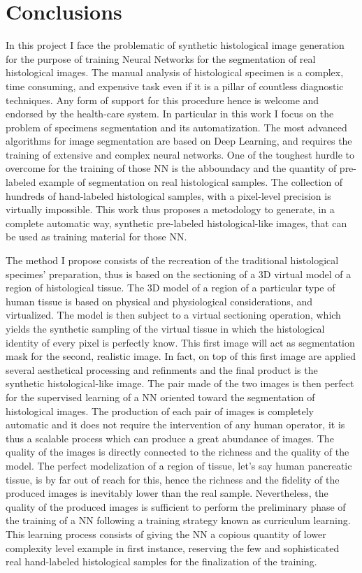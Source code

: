 \chapter*{Conclusions}
\label{chap:concl}

In this project I face the problematic of synthetic histological image generation for the purpose of training Neural Networks for the segmentation of real histological images. The manual analysis of histological specimen is a complex, time consuming, and expensive task even if it is a pillar of countless diagnostic techniques. Any form of support for this procedure hence is welcome and endorsed by the health-care system. In particular in this work I focus on the problem of specimens segmentation and its automatization. The most advanced algorithms for image segmentation are based on Deep Learning, and requires the training of extensive and complex neural networks. One of the toughest hurdle to overcome for the training of those NN is the abboundacy and the quantity of pre-labeled example of segmentation on real histological samples. The collection of hundreds of hand-labeled histological samples, with a pixel-level precision is virtually impossible. This work thus proposes a metodology to generate, in a complete automatic way, synthetic pre-labeled histological-like images, that can be used as training material for those NN.

The method I propose consists of the recreation of the traditional histological specimes' preparation, thus is based on the sectioning of a 3D virtual model of a region of histological tissue. The 3D model of a region of a particular type of human tissue is based on physical and physiological considerations, and virtualized. The model is then subject to a virtual sectioning operation, which yields the synthetic sampling of the virtual tissue in which the histological identity of every pixel is perfectly know. This first image will act as segmentation mask for the second, realistic image. In fact, on top of this first image are applied several aesthetical processing and refinments and the final product is the synthetic histological-like image. The pair made of the two images is then perfect for the supervised learning of a NN oriented toward the segmentation of histological images. The production of each pair of images is completely automatic and it does not require the intervention of any human operator, it is thus a scalable process which can produce a great abundance of images. The quality of the images is directly connected to the richness and the quality of the model. The perfect modelization of a region of tissue, let's say human pancreatic tissue, is by far out of reach for this, hence the richness and the fidelity of the produced images is inevitably lower than the real sample. Nevertheless, the quality of the produced images is sufficient to perform the preliminary phase of the training of a NN following a training strategy known as curriculum learning. This learning process consists of giving the NN a copious quantity of lower complexity level example in first instance, reserving the few and sophisticated real hand-labeled histological samples for the finalization of the training.

